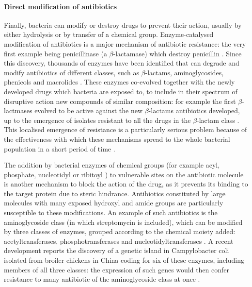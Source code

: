 \paragraph{Direct modification of antibiotics}
Finally, bacteria can modify or destroy drugs to prevent their action, usually by either hydrolysis or by transfer of a chemical group.
%
Enzyme-catalysed modification of antibiotics is a major mechanism of antibiotic resistance: the very first example being penicillinase (a $\beta$-lactamase) which destroy penicillin \cite{Abraham1988}.
%
Since this discovery, thousands of enzymes have been identified that can degrade and modify antibiotics of different classes, such as $\beta$-lactams, aminoglycosides, phenicols and macrolides \cite{Livermore2008,Nordmann2011,Voulgari2013,Woodford2011}.
%
These enzymes co-evolved together with the newly developed drugs which bacteria are exposed to, to include in their spectrum of disruptive action new compounds of similar composition: for example the first $\beta$-lactmases evolved to be active against the new $\beta$-lactams antibiotics developed, up to the emergence of isolates resistant to all the drugs in the $\beta$-lactam class \cite{Woodford2013}.
%
This localised emergence of resistance is a particularly serious problem because of the effectiveness with which these mechanisms spread to the whole bacterial population in a short period of time \cite{Voulgari2013,Woodford2013,Lynch2013}.
%

The addition by bacterial enzymes of chemical groups (for example acyl, phosphate, nucleotidyl or ribitoyl \cite{Wright2005}) to vulnerable sites on the antibiotic molecule is another mechanism to block the action of the drug, as it prevents its binding to the target protein due to steric hindrance.
%
Antibiotics constituted by large molecules with many exposed hydroxyl and amide groups are particularly susceptible to these modifications. An example of such antibiotics is the aminoglycoside class (in which streptomycin is included), which can be modified by three classes of enzymes, grouped according to the chemical moiety added: acetyltransferases, phosphotransferases and nucleotidyltransferases \cite{Norris2013}.
%
A recent development reports the discovery of a genetic island in Campylobacter coli isolated from broiler chickens in China coding for six of these enzymes, including members of all three classes: the expression of such genes would then confer resistance to many antibiotic of the aminoglycoside class at once \cite{Qin2012}.

